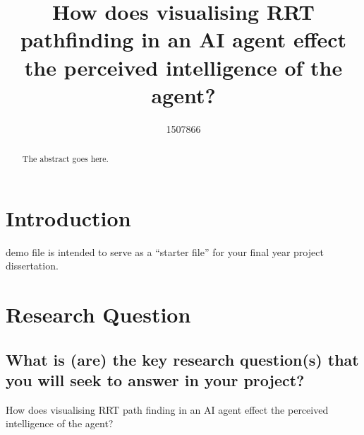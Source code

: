 \documentclass[journal]{IEEEtran}
\begin{document}
%
\title{How does visualising RRT pathfinding in an AI agent effect the perceived intelligence of the agent?}
%
%
\author{1507866}


\maketitle

\begin{abstract}
The abstract goes here.
\end{abstract}

\section{Introduction}
% 
% 
% 
% 
 demo file is intended to serve as a ``starter file''
for your final year project dissertation.
\section{Research Question}
\subsection{What is (are) the key research question(s) that you will seek to answer in	your project?}
How does visualising RRT path finding in an AI agent effect the perceived intelligence of the agent?
\end{document}
